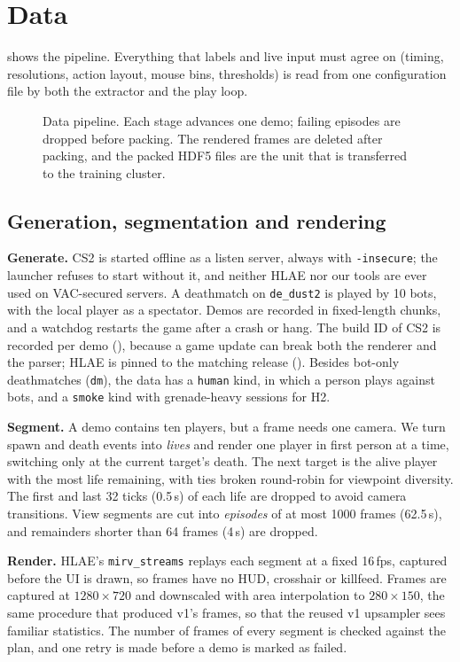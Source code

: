 \section{Data}
\label{sec:data}
 shows the pipeline. Everything that labels and live input must agree on (timing, resolutions, action layout, mouse bins, thresholds) is read from one configuration file by both the extractor and the play loop.

\begin{figure}[t]
  \centering
  
  \caption{Data pipeline. Each stage advances one demo; failing episodes are dropped before packing. The rendered frames are deleted after packing, and the packed HDF5 files are the unit that is transferred to the training cluster.}
  \label{fig:pipeline}
\end{figure}

\subsection{Generation, segmentation and rendering}
\textbf{Generate.}
CS2 is started offline as a listen server, always with \texttt{-insecure}; the launcher refuses to start without it, and neither HLAE nor our tools are ever used on VAC-secured servers.
A deathmatch on \texttt{de\_dust2} is played by 10 bots, with the local player as a spectator.
Demos are recorded in fixed-length chunks, and a watchdog restarts the game after a crash or hang.
The build ID of CS2 is recorded per demo (\TBDcsbuild), because a game update can break both the renderer and the parser; HLAE is pinned to the matching release (\TBDhlaever).
Besides bot-only deathmatches (\texttt{dm}), the data has a \texttt{human} kind, in which a person plays against bots, and a \texttt{smoke} kind with grenade-heavy sessions for H2.

\textbf{Segment.}
A demo contains ten players, but a frame needs one camera.
We turn spawn and death events into \emph{lives} and render one player in first person at a time, switching only at the current target's death.
The next target is the alive player with the most life remaining, with ties broken round-robin for viewpoint diversity.
The first and last 32 ticks (0.5\,s) of each life are dropped to avoid camera transitions.
View segments are cut into \emph{episodes} of at most 1000 frames (62.5\,s), and remainders shorter than 64 frames (4\,s) are dropped.

\textbf{Render.}
HLAE's \texttt{mirv\_streams} replays each segment at a fixed 16\,fps, captured before the UI is drawn, so frames have no HUD, crosshair or killfeed.
Frames are captured at $1280{\times}720$ and downscaled with area interpolation to $280{\times}150$, the same procedure that produced v1's frames, so that the reused v1 upsampler sees familiar statistics.
The number of frames of every segment is checked against the plan, and one retry is made before a demo is marked as failed.

